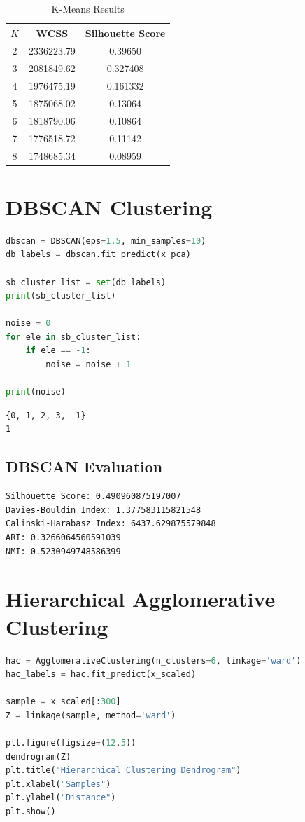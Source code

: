\documentclass[12pt,a4paper]{article}
\begin{document}
\begin{table}[H]
\centering
\caption{K-Means Results}
\begin{tabular}{ccc}
\toprule
$K$ & WCSS & Silhouette Score\\
\midrule
2 & 2336223.79 & 0.39650\\
3 & 2081849.62 & 0.327408\\
4 & 1976475.19 & 0.161332\\
5 & 1875068.02 & 0.13064\\
6 & 1818790.06 & 0.10864\\
7 & 1776518.72 & 0.11142\\
8 & 1748685.34 & 0.08959\\
\bottomrule
\end{tabular}
\end{table}

\section{DBSCAN Clustering}
\begin{lstlisting}[language=Python]
dbscan = DBSCAN(eps=1.5, min_samples=10)
db_labels = dbscan.fit_predict(x_pca)

sb_cluster_list = set(db_labels)
print(sb_cluster_list)

noise = 0
for ele in sb_cluster_list:
    if ele == -1:
        noise = noise + 1

print(noise)
\end{lstlisting}

\begin{verbatim}
{0, 1, 2, 3, -1}
1
\end{verbatim}

\subsection{DBSCAN Evaluation}
\begin{verbatim}
Silhouette Score: 0.490960875197007
Davies-Bouldin Index: 1.377583115821548
Calinski-Harabasz Index: 6437.629875579848
ARI: 0.3266064560591039
NMI: 0.5230949748586399
\end{verbatim}

\section{Hierarchical Agglomerative Clustering}
\begin{lstlisting}[language=Python]
hac = AgglomerativeClustering(n_clusters=6, linkage='ward')
hac_labels = hac.fit_predict(x_scaled)

sample = x_scaled[:300]
Z = linkage(sample, method='ward')

plt.figure(figsize=(12,5))
dendrogram(Z)
plt.title("Hierarchical Clustering Dendrogram")
plt.xlabel("Samples")
plt.ylabel("Distance")
plt.show()
\end{lstlisting}
\end{document}
